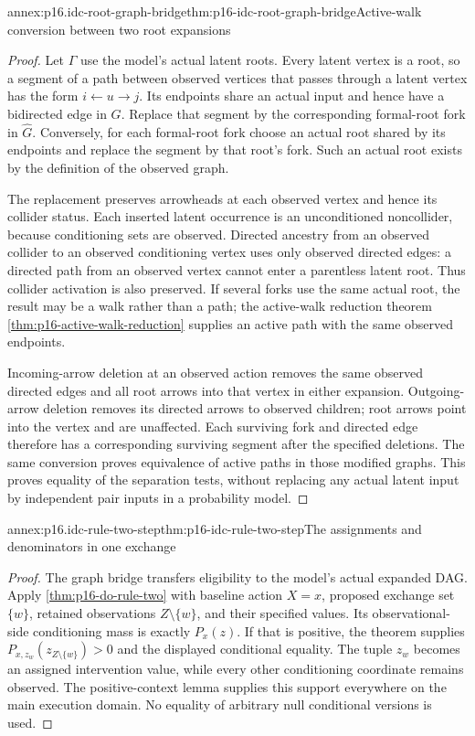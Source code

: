 \begin{annexitem}{annex:p16.idc-root-graph-bridge}{thm:p16-idc-root-graph-bridge}{Active-walk conversion between two root expansions}
\begin{proof}
Let \(\Gamma\) use the model's actual latent roots. Every
latent vertex is a root, so a segment of a path between observed
vertices that passes through a latent vertex has the form
\(i\leftarrow u\to j\). Its endpoints share an actual
input and hence have a bidirected edge in \(G\). Replace
that segment by the corresponding formal-root fork in \(\widehat G\).
Conversely, for each formal-root fork choose an actual root shared
by its endpoints and replace the segment by that root's fork.
Such an actual root exists by the definition of the observed graph.

The replacement preserves arrowheads at each observed vertex and
hence its collider status. Each inserted latent occurrence is an
unconditioned noncollider, because conditioning sets are observed.
Directed ancestry from an observed collider to an observed conditioning
vertex uses only observed directed edges: a directed path from an
observed vertex cannot enter a parentless latent root. Thus collider
activation is also preserved. If several forks use the same actual
root, the result may be a walk rather than a path; the active-walk
reduction theorem \cref{thm:p16-active-walk-reduction} supplies
an active path with the same observed endpoints.

Incoming-arrow deletion at an observed action removes the same
observed directed edges and all root arrows into that vertex in
either expansion. Outgoing-arrow deletion removes its directed
arrows to observed children; root arrows point into the vertex
and are unaffected. Each surviving fork and directed edge therefore
has a corresponding surviving segment after the specified deletions.
The same conversion proves equivalence of active paths in those
modified graphs. This proves equality of the separation tests,
without replacing any actual latent input by independent pair inputs
in a probability model.
\end{proof}
\end{annexitem}

\begin{annexitem}{annex:p16.idc-rule-two-step}{thm:p16-idc-rule-two-step}{The assignments and denominators in one exchange}
\begin{proof}
The graph bridge transfers eligibility to the model's actual expanded
DAG. Apply \cref{thm:p16-do-rule-two} with baseline action
\(X=x\), proposed exchange set \(\{w\}\), retained
observations \(Z\setminus\{w\}\), and their specified values.
Its observational-side conditioning mass is exactly \(P_x(z)\).
If that is positive, the theorem supplies
\(P_{x,z_w}(z_{Z\setminus\{w\}})>0\) and the displayed
conditional equality. The tuple \(z_w\) becomes an assigned
intervention value, while every other conditioning coordinate remains
observed. The positive-context lemma supplies this support everywhere
on the main execution domain. No equality of arbitrary null
conditional versions is used.
\end{proof}
\end{annexitem}

